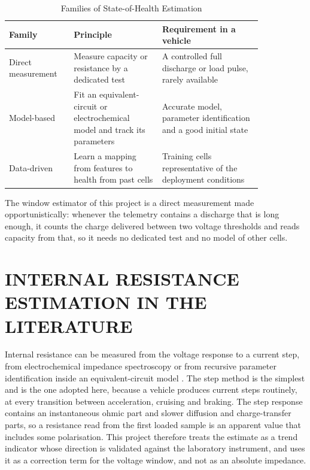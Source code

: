 \documentclass[12pt,a4paper]{amritareport}
\begin{document}
\begin{table}[htbp]
	\caption{Families of State-of-Health Estimation}
	\centering
	\small
	\renewcommand{\arraystretch}{1.15}
	\setlength{\tabcolsep}{4pt}
	\begin{tabular}{|L{0.2\linewidth}|L{0.3\linewidth}|L{0.34\linewidth}|}
		\hline
		\textbf{Family} & \textbf{Principle} & \textbf{Requirement in a vehicle} \\
		\hline
		Direct measurement & Measure capacity or resistance by a dedicated test & A controlled full discharge or load pulse, rarely available \\
		\hline
		Model-based & Fit an equivalent-circuit or electrochemical model and track its parameters & Accurate model, parameter identification and a good initial state \\
		\hline
		Data-driven & Learn a mapping from features to health from past cells & Training cells representative of the deployment conditions \\
		\hline
	\end{tabular}
	\label{tab:taxonomy}
\end{table}

The window estimator of this project is a direct measurement made opportunistically: whenever the telemetry contains a discharge that is long enough, it counts the charge delivered between two voltage thresholds and reads capacity from that, so it needs no dedicated test and no model of other cells.

\section{INTERNAL RESISTANCE ESTIMATION IN THE LITERATURE}

Internal resistance can be measured from the voltage response to a current step, from electrochemical impedance spectroscopy or from recursive parameter identification inside an equivalent-circuit model \cite{plett2004,waag2014}. The step method is the simplest and is the one adopted here, because a vehicle produces current steps routinely, at every transition between acceleration, cruising and braking. The step response contains an instantaneous ohmic part and slower diffusion and charge-transfer parts, so a resistance read from the first loaded sample is an apparent value that includes some polarisation. This project therefore treats the estimate as a trend indicator whose direction is validated against the laboratory instrument, and uses it as a correction term for the voltage window, and not as an absolute impedance.
\end{document}
